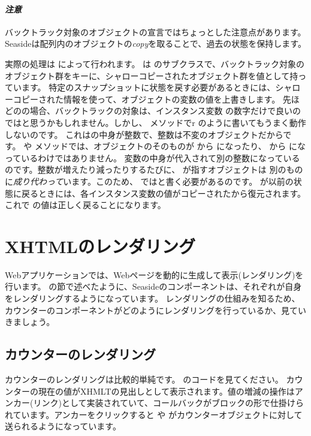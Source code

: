 \documentclass[a4paper,10pt,twoside]{book}
\begin{document}
{{\paragraph{\emph{注意}}
バックトラック対象のオブジェクトの宣言ではちょっとした注意点があります。
Seasideは配列内のオブジェクトの\emph{copy}を取ることで、過去の状態を保持します。

実際の処理は  によって行われます。 は  のサブクラスで、バックトラック対象のオブジェクト群をキーに、シャローコピーされたオブジェクト群を値として持っています。
特定のスナップショットに状態を戻す必要があるときには、シャローコピーされた情報を使って、オブジェクトの変数の値を上書きします。
先ほどのの場合、バックトラックの対象は、インスタンス変数 の数字だけで良いのではと思うかもしれません。しかし、   メソッドでr のように書いてもうまく動作しないのです。
これはの中身が整数で、整数は不変のオブジェクトだからです。
  や  メソッドでは、オブジェクトのそのものが から  になったり、 から になっているわけではありません。
  変数の中身が代入されて別の整数になっているのです。整数が増えたり減ったりするたびに、  が指すオブジェクトは 別のものに\emph{成り代わって}います。このため、 ではと書く必要があるのです。 \mbox{} が以前の状態に戻るときには、各インスタンス変数の値がコピーされた\mbox{}から復元されます。これで  の値は正しく戻ることになります。

\section{XHTMLのレンダリング}

Webアプリケーションでは、Webページを動的に生成して表示(レンダリング)を行います。 の節で述べたように、Seasideのコンポーネントは、それぞれが自身をレンダリングするようになっています。
レンダリングの仕組みを知るため、カウンターのコンポーネントがどのようにレンダリングを行っているか、見ていきましょう。

\subsection{カウンターのレンダリング}

カウンターのレンダリングは比較的単純です。 のコードを見てください。
カウンターの現在の値がXHMLTの見出しとして表示されます。値の増減の操作はアンカー(リンク)として実装されていて、コールバックがブロックの形で仕掛けられています。アンカーをクリックすると  や がカウンターオブジェクトに対して送られるようになっています。

}}
\end{document}
